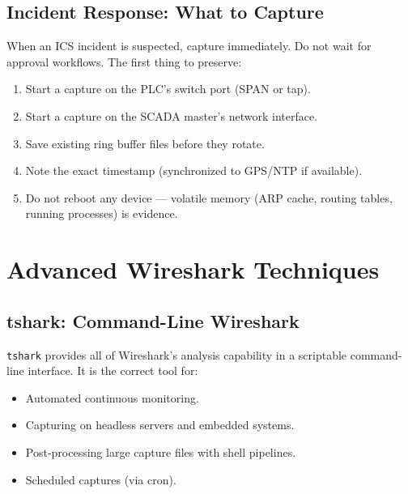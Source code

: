 \documentclass[12pt,twoside,openright]{memoir}
\begin{document}
\section{Incident Response: What to Capture}

When an ICS incident is suspected, capture immediately. Do not wait for approval workflows. The first thing to preserve:
\begin{enumerate}[noitemsep]
  \item Start a capture on the PLC's switch port (SPAN or tap).
  \item Start a capture on the SCADA master's network interface.
  \item Save existing ring buffer files before they rotate.
  \item Note the exact timestamp (synchronized to GPS/NTP if available).
  \item Do not reboot any device --- volatile memory (ARP cache, routing tables, running processes) is evidence.
\end{enumerate}

\chapter{Advanced Wireshark Techniques}

\section{tshark: Command-Line Wireshark}

\texttt{tshark} provides all of Wireshark's analysis capability in a scriptable command-line interface. It is the correct tool for:
\begin{itemize}[noitemsep]
  \item Automated continuous monitoring.
  \item Capturing on headless servers and embedded systems.
  \item Post-processing large capture files with shell pipelines.
  \item Scheduled captures (via cron).
\end{itemize}
\end{document}
